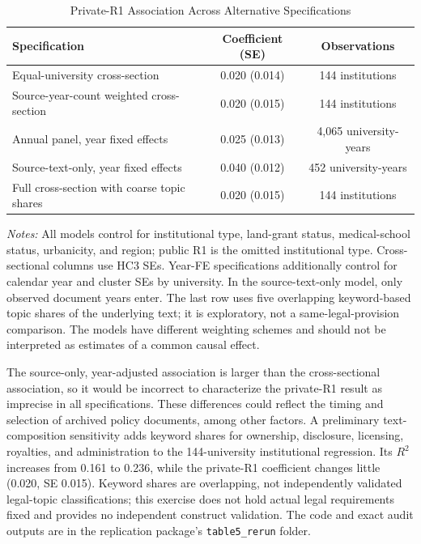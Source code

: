 \documentclass[11pt]{article}
\begin{document}
\begin{table}[htbp]\centering\caption{Private-R1 Association Across Alternative Specifications}\label{tab:inst_sensitivity}\small
\begin{tabular}{lcc}\toprule
Specification & Coefficient (SE) & Observations\\\midrule
Equal-university cross-section & 0.020 (0.014) & 144 institutions\\
Source-year-count weighted cross-section & 0.020 (0.015) & 144 institutions\\
Annual panel, year fixed effects & 0.025 (0.013) & 4,065 university-years\\
Source-text-only, year fixed effects & 0.040 (0.012) & 452 university-years\\
Full cross-section with coarse topic shares & 0.020 (0.015) & 144 institutions\\\bottomrule
\end{tabular}
\par\smallskip\begin{minipage}{.94\linewidth}\footnotesize\emph{Notes:} All models control for institutional type, land-grant status, medical-school status, urbanicity, and region; public R1 is the omitted institutional type. Cross-sectional columns use HC3 SEs. Year-FE specifications additionally control for calendar year and cluster SEs by university. In the source-text-only model, only observed document years enter. The last row uses five overlapping keyword-based topic shares of the underlying text; it is exploratory, not a same-legal-provision comparison. The models have different weighting schemes and should not be interpreted as estimates of a common causal effect.\end{minipage}
\end{table}

The source-only, year-adjusted association is larger than the cross-sectional association, so it would be incorrect to characterize the private-R1 result as imprecise in all specifications. These differences could reflect the timing and selection of archived policy documents, among other factors. A preliminary text-composition sensitivity adds keyword shares for ownership, disclosure, licensing, royalties, and administration to the 144-university institutional regression. Its $R^2$ increases from 0.161 to 0.236, while the private-R1 coefficient changes little (0.020, SE 0.015). Keyword shares are overlapping, not independently validated legal-topic classifications; this exercise does not hold actual legal requirements fixed and provides no independent construct validation. The code and exact audit outputs are in the replication package's \texttt{table5\_rerun} folder.
\end{document}
